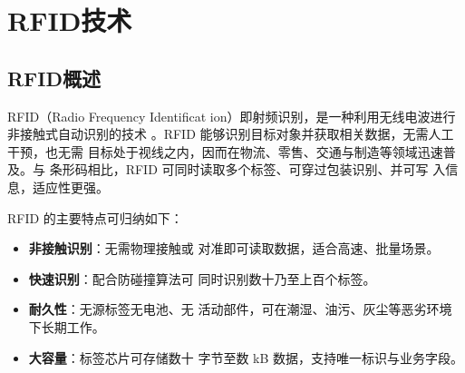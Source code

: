 
\chapter{RFID技术}
\label{chap:rfid_technology}

\section{RFID概述}
\label{sec:rfid_intro}

RFID（Radio Frequency Identificat
ion）即射频识别，是一种利用无线电波进行非接触式自动识别的技术
。RFID 能够识别目标对象并获取相关数据，无需人工干预，也无需
目标处于视线之内，因而在物流、零售、交通与制造等领域迅速普及。与
条形码相比，RFID 可同时读取多个标签、可穿过包装识别、并可写
入信息，适应性更强。

RFID 的主要特点可归纳如下：

\begin{itemize}
    \item \textbf{非接触识别}：无需物理接触或
对准即可读取数据，适合高速、批量场景。
    \item \textbf{快速识别}：配合防碰撞算法可
同时识别数十乃至上百个标签。
    \item \textbf{耐久性}：无源标签无电池、无
活动部件，可在潮湿、油污、灰尘等恶劣环境下长期工作。
    \item \textbf{大容量}：标签芯片可存储数十
字节至数 kB 数据，支持唯一标识与业务字段。
\end{itemize}

